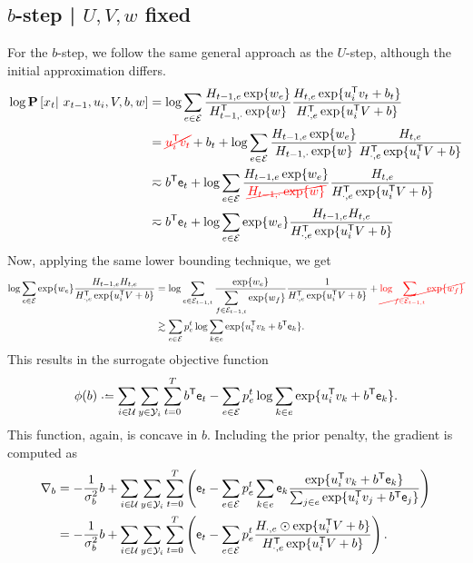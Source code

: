 \documentclass{article}
\newcommand{\ccancel}[2][black]{\color{#1}\cancel{#2}\normalcolor}
\def\e{\ensuremath{\mathsf{e}}}
\def\E{\ensuremath{\mathcal{E}}}
\def\U{\ensuremath{\mathcal{U}}}
\begin{document}
\subsection{$b$-step | $U, V, w$ fixed}
For the $b$-step, we follow the same general approach as the $U$-step, although the initial approximation differs.
\begin{align}
\log\P\left[x_t \given x_{t-1}, u_i, V, b, w\right] 
&= \log\sum_{e\in \E} \frac{H_{t-1,e} \exp\{w_e\} }{H_{t-1,\cdot}\trans \exp\{w\}} \frac{H_{t,e} \exp\{u_i\trans v_t + b_t \} }{H_{\cdot,e}\trans \exp\{u_i\trans V + b \} }\notag\\
&= \ccancel[red]{u_i\trans v_t} + b_t + \log\sum_{e\in \E} \frac{H_{t-1,e}\exp\{w_e\} }{H_{t-1,\cdot}\exp\{w\}}\frac{H_{t, e}}{H_{\cdot,e}\trans \exp\{u_i\trans V + b \} }\notag\\
&\eqsim b\trans \e_t + \log\sum_{e\in \E} \frac{H_{t-1,e} \exp\{w_e\}}{\ccancel[red]{H_{t-1,\cdot} \exp\{w\} }}\frac{ H_{t,e} }{H_{\cdot,e}\trans \exp\{u_i\trans V + b \} }\notag\\
&\eqsim b\trans \e_t + \log\sum_{e\in \E} \exp\{w_e\} \frac{ H_{t-1,e} H_{t,e} }{H_{\cdot,e}\trans \exp\{u_i\trans V + b \} }\notag\\
\end{align}
Now, applying the same lower bounding technique, we get 
\begin{align}
\log\sum_{e\in \E} \exp\{w_e\} \frac{ H_{t-1,e} H_{t,e} }{H_{\cdot,e}\trans \exp\{u_i\trans V + b \} }
&=
\log\sum_{e\in \E_{t-1,t}} \frac{\exp\{w_e\}}{\displaystyle\sum_{f\in \E_{t-1,t}}\exp\{w_f\}} \frac{ 1 }{H_{\cdot,e}\trans \exp\{u_i\trans V + b \} } + \ccancel[red]{\log\sum_{f\in\E_{t-1,t}}
\exp\{w_f\}}\notag\\
&\gtrsim \sum_{e\in\E} p_e^t \log \sum_{k\in e} \exp\{u_i\trans v_k + b\trans \e_k\}\label{eq:bstep:concave}.
\end{align}
This results in the surrogate objective function
\begin{equation}
\phi(b) \defeq \sum_{i\in\U}\sum_{y\in\Y_i}\sum_{t=0}^T b\trans \e_t - \sum_{e\in\E} p_e^t \log \sum_{k\in e} \exp\{u_i\trans v_k + b\trans \e_k\}.\label{eq:bstep:surrogate}
\end{equation}
This function, again, is concave in $b$.  Including the prior penalty, the gradient is computed as
\begin{align}
\nabla_b &= -\frac{1}{\sigma_b^2} b + \sum_{i\in\U}\sum_{y\in\Y_i}\sum_{t=0}^T \left( \e_t - \sum_{e\in\E} p_e^t \sum_{k\in e} \e_k \frac{\exp\{u_i\trans v_k + b\trans \e_k\}}{\sum_{j\in e} \exp\{u_i\trans
v_j + b\trans \e_j\}}  \right)\notag\\
&= -\frac{1}{\sigma_b^2} b + \sum_{i\in\U}\sum_{y\in\Y_i}\sum_{t=0}^T \left( \e_t - \sum_{e\in\E} p_e^t \frac{H_{\cdot, e} \odot \exp\{u_i\trans V + b \}}{ H_{\cdot,e}\trans \exp\{u_i\trans V + b\}}  \right)
\label{eq:bstep:gradient}.
\end{align}
\end{document}
